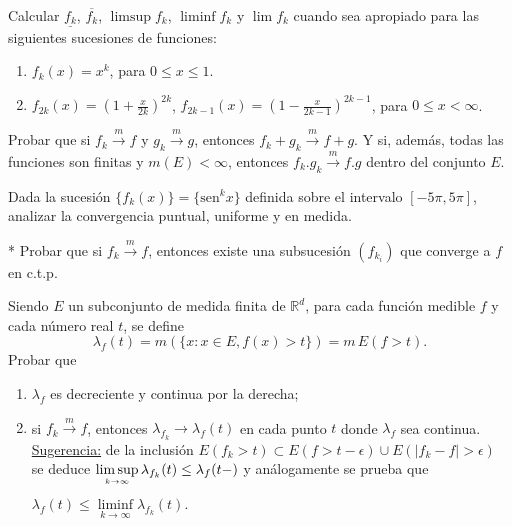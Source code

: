 \documentclass{book}
\newcommand{\rr}{\mathbb{R}}
\begin{document}
\begin{ejer}{}
Calcular $\underline{f_k}$, $\overline{f_k}$, $\limsup f_k$, $\liminf f_k$ y $\lim f_k$ cuando sea
apropiado para las siguientes sucesiones de funciones:
\begin{enumerate}
\item
$f_k(x)=x^k$, \; para $0\leq x\leq 1.$
\item $f_{2k}(x)=\left(1+\frac{x}{2k}\right)^{2k}$, $f_{2k-1}(x)=\left(1-\frac{x}{2k-1}\right)^{2k-1}$, \;para $0\leq x<\infty$.
\end{enumerate}
\end{ejer}



\begin{ejer}{} Probar que si $f_k \stackrel{m}{\rightarrow}f$ \;y\; $g_k \stackrel{m}{\rightarrow}g$, entonces \;
$f_k+g_k \stackrel{m}{\rightarrow}f+g$.  
Y si, además, todas las funciones son finitas y $m(E)<\infty$, entonces $f_k.g_k \stackrel{m} \rightarrow f.g$
dentro del conjunto $E$.
\end{ejer}

\begin{ejer}{} 
Dada la sucesión $\{f_k(x)\}=\{\text{sen}^k x\}$ definida sobre el intervalo $[-5 \pi, 5\pi]$, 
analizar  la convergencia puntual, uniforme y en medida.
\end{ejer}


\begin{ejer}{}* 
Probar que si $f_k \stackrel{m}{\rightarrow}f$, \;entonces existe una subsucesión $(f_{k_i})$ que 
converge a $f$ en c.t.p.
\end{ejer}

\begin{ejer}{} 
 Siendo $E$ un subconjunto de medida finita de $\rr^d$,\;  para cada función medible $f$
y cada n\'umero real $t$, se define
$$\lambda_f(t)=m(\{x:x\in E,f(x)>t\})=m\,E(f>t).$$
Probar que 
	\begin{enumerate}
  \item $\lambda_f$ es decreciente y continua por la derecha;
  \item si $f_k \stackrel {m}{\rightarrow}f$, entonces $\lambda_{f_k} \rightarrow \lambda_f(t)$
  en cada punto $t$ donde $\lambda_f$ sea continua.
\\
  \underline{Sugerencia:}
de la inclusión $E(f_k>t)\subset E(f>t-\epsilon)\cup E(|f_k-f|>\epsilon) $
se deduce \;$\limsup\limits_{{k\rightarrow \infty}\atop} \lambda_{f_k}(t)\leq \lambda_{f}(t-)$\; y análogamente se prueba que 
\;$\lambda_f(t)\leq \liminf\limits_{k\rightarrow \infty} \lambda_{f_k}(t).\;$
	\end{enumerate}
\end{ejer}

\end{document}
